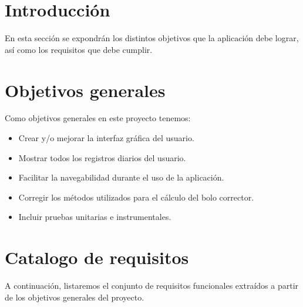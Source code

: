 
\section{Introducción}
En esta sección se expondrán los distintos objetivos que la aplicación debe lograr, así como los requisitos que debe cumplir.
\section{Objetivos generales}
Como objetivos generales en este proyecto tenemos:
\begin{itemize}
	\item Crear y/o mejorar la interfaz gráfica del usuario.
	\item Mostrar todos los registros diarios del usuario.
	\item Facilitar la navegabilidad durante el uso de la aplicación.
	\item Corregir los métodos utilizados para el cálculo del bolo corrector.
	\item Incluir pruebas unitarias e instrumentales.
\end{itemize}
\section{Catalogo de requisitos}
A continuación, listaremos el conjunto de requisitos funcionales extraídos a partir de los objetivos generales del proyecto.
